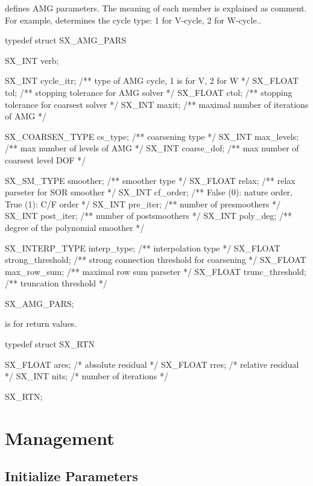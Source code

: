  defines AMG parameters. The meaning of each member is explained as comment. For example,
determines the cycle type: 1 for V-cycle, 2 for W-cycle..
\begin{evb}
typedef struct SX_AMG_PARS
{
    SX_INT verb;

    SX_INT   cycle_itr;          /** type of AMG cycle, 1 is for V, 2 for W */
    SX_FLOAT tol;                /** stopping tolerance for AMG solver */
    SX_FLOAT ctol;               /** stopping tolerance for coarsest solver */
    SX_INT   maxit;              /** maximal number of iterations of AMG */

    SX_COARSEN_TYPE cs_type;     /** coarsening type */
    SX_INT max_levels;           /** max number of levels of AMG */
    SX_INT coarse_dof;           /** max number of coarsest level DOF */

    SX_SM_TYPE smoother;         /** smoother type */
    SX_FLOAT relax;              /** relax parseter for SOR smoother */
    SX_INT cf_order;             /** False (0): nature order, True (1): C/F order */
    SX_INT pre_iter;             /** number of presmoothers */
    SX_INT post_iter;            /** number of postsmoothers */
    SX_INT poly_deg;             /** degree of the polynomial smoother */

    SX_INTERP_TYPE interp_type;  /** interpolation type */
    SX_FLOAT strong_threshold;   /** strong connection threshold for coarsening */
    SX_FLOAT max_row_sum;        /** maximal row sum parseter */
    SX_FLOAT trunc_threshold;    /** truncation threshold */

} SX_AMG_PARS;
\end{evb}

 is for return values.
\begin{evb}
typedef struct SX_RTN
{
    SX_FLOAT ares;     /* absolute residual */
    SX_FLOAT rres;     /* relative residual */
    SX_INT   nits;     /* number of iterations */

} SX_RTN;
\end{evb}

\section{Management}

\subsection{Initialize Parameters}

